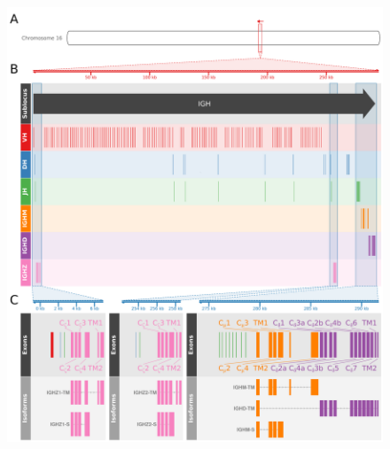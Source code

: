	\begin{figure}
	\centering
	\includegraphics[width=\textwidth]{_Figures/png/xma-new-locus-map}
	\caption[The immunoglobulin heavy chain (\textit{IGH}) locus in \textit{}]{\textbf{The immunoglobulin heavy chain (\textit{IGH}) locus in \textit{Xiphophorus maculatus}:} (A) Position of the \textit{IGH} locus on chromosome (group) 16 of the \Xma genome. (B) Arrangement of \vh, \dh, \jh and constant-region gene segments on the \Xma \textit{IgH} locus. (C) Detailed map of the ,  and  constant regions, indicating the position and identity of the constant-region exons and the exon composition of expressed \igh{} isoforms in \Xma.}
	\begin{subfigure}{0em}
        \label{fig:xma-locus-map-a}
    \end{subfigure}
    \begin{subfigure}{0em}
        \label{fig:xma-locus-map-b}
    \end{subfigure}
    \begin{subfigure}{0em}
        \label{fig:xma-locus-map-c}
    \end{subfigure}
	\label{fig:xma-locus-map}
\end{figure}

